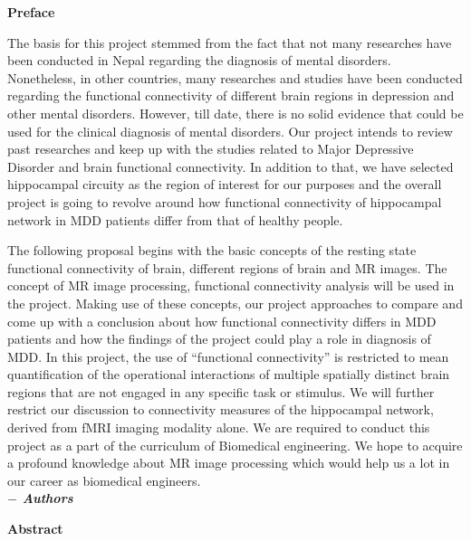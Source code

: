 ﻿\documentclass[12pt]{article}
\begin{document}
\clearpage
\setcounter{page}{1}
\hskip180pt {\textbf{\centering \large Preface} }
\vskip2pt

The basis for this project stemmed from the fact that not many
researches have been conducted in Nepal regarding the diagnosis of
mental disorders. Nonetheless, in other countries, many researches and
studies have been conducted regarding the functional connectivity of
different brain regions in depression and other mental
disorders. However, till date, there is no solid evidence that could
be used for the clinical diagnosis of mental disorders. Our project
intends to review past researches and keep up with the studies related
to Major Depressive Disorder and brain functional connectivity. In
addition to that, we have selected hippocampal circuity as the region
of interest for our purposes and the overall project is going to
revolve around how functional connectivity of hippocampal network in
MDD patients differ from that of healthy people.

The following proposal begins with the basic concepts of the resting
state functional connectivity of brain, different regions of brain and
MR images. The concept of MR image processing, functional connectivity
analysis will be used in the project. Making use of these concepts,
our project approaches to compare and come up with a conclusion about
how functional connectivity differs in MDD patients and how the
findings of the project could play a role in diagnosis of MDD. In this
project, the use of ``functional connectivity'' is restricted to mean
quantification of the operational interactions of multiple spatially
distinct brain regions that are not engaged in any specific task or
stimulus. We will further restrict our discussion to connectivity
measures of the hippocampal network, derived from fMRI imaging
modality alone.  We are required to conduct this project as a part of
the curriculum of Biomedical engineering. We hope to acquire
a profound knowledge about MR image processing which would help us
a lot in our career as biomedical engineers. \\ [1cm]

\hspace*{138mm}\textbf{\textit {$-$ Authors}}
\newpage

\hskip180pt {\textbf{\centering \large Abstract} }
\vskip2pt
\end{document}
